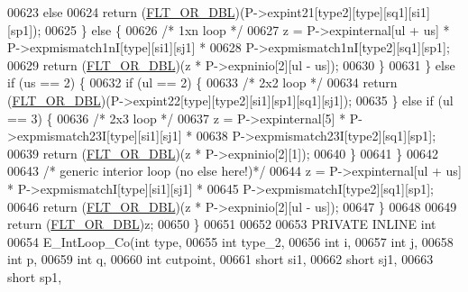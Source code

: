 \begin{DoxyCode}
00623         \textcolor{keywordflow}{else}
00624           \textcolor{keywordflow}{return} (\hyperlink{group__data__structures_ga31125aeace516926bf7f251f759b6126}{FLT\_OR\_DBL})(P->expint21[type2][type][sq1][si1][sp1]);
00625       \} \textcolor{keywordflow}{else} \{
00626         \textcolor{comment}{/* 1xn loop */}
00627         z = P->expinternal[ul + us] * P->expmismatch1nI[type][si1][sj1] *
00628             P->expmismatch1nI[type2][sq1][sp1];
00629         \textcolor{keywordflow}{return} (\hyperlink{group__data__structures_ga31125aeace516926bf7f251f759b6126}{FLT\_OR\_DBL})(z * P->expninio[2][ul - us]);
00630       \}
00631     \} \textcolor{keywordflow}{else} \textcolor{keywordflow}{if} (us == 2) \{
00632       \textcolor{keywordflow}{if} (ul == 2) \{
00633         \textcolor{comment}{/* 2x2 loop */}
00634         \textcolor{keywordflow}{return} (\hyperlink{group__data__structures_ga31125aeace516926bf7f251f759b6126}{FLT\_OR\_DBL})(P->expint22[type][type2][si1][sp1][sq1][sj1]);
00635       \} \textcolor{keywordflow}{else} \textcolor{keywordflow}{if} (ul == 3) \{
00636         \textcolor{comment}{/* 2x3 loop */}
00637         z = P->expinternal[5] * P->expmismatch23I[type][si1][sj1] *
00638             P->expmismatch23I[type2][sq1][sp1];
00639         \textcolor{keywordflow}{return} (\hyperlink{group__data__structures_ga31125aeace516926bf7f251f759b6126}{FLT\_OR\_DBL})(z * P->expninio[2][1]);
00640       \}
00641     \}
00642 
00643     \textcolor{comment}{/* generic interior loop (no else here!)*/}
00644     z = P->expinternal[ul + us] * P->expmismatchI[type][si1][sj1] *
00645         P->expmismatchI[type2][sq1][sp1];
00646     \textcolor{keywordflow}{return} (\hyperlink{group__data__structures_ga31125aeace516926bf7f251f759b6126}{FLT\_OR\_DBL})(z * P->expninio[2][ul - us]);
00647   \}
00648 
00649   \textcolor{keywordflow}{return} (\hyperlink{group__data__structures_ga31125aeace516926bf7f251f759b6126}{FLT\_OR\_DBL})z;
00650 \}
00651 
00652 
00653 PRIVATE INLINE \textcolor{keywordtype}{int}
00654 E\_IntLoop\_Co(\textcolor{keywordtype}{int}          type,
00655              \textcolor{keywordtype}{int}          type\_2,
00656              \textcolor{keywordtype}{int}          i,
00657              \textcolor{keywordtype}{int}          j,
00658              \textcolor{keywordtype}{int}          p,
00659              \textcolor{keywordtype}{int}          q,
00660              \textcolor{keywordtype}{int}          cutpoint,
00661              \textcolor{keywordtype}{short}        si1,
00662              \textcolor{keywordtype}{short}        sj1,
00663              \textcolor{keywordtype}{short}        sp1,

\end{DoxyCode}
